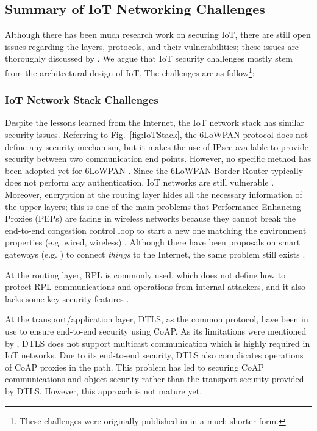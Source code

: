 \documentclass{ieeeaccess}
\begin{document}
\subsection{Summary of IoT Networking Challenges} \label{sec:from-prev}

Although there has been much research work on securing IoT, there are still open issues regarding the layers, protocols, and their vulnerabilities; these issues are thoroughly discussed by \cite{7005393, yang2017survey}. 
% 
We argue that IoT security challenges mostly stem from the architectural design of IoT. The challenges are as follow\footnote{These challenges were originally published in \cite{ramezanifarkhani2018securing} in a much shorter form.}:

\subsubsection{IoT Network Stack Challenges}
Despite the lessons learned from the Internet, the IoT network stack has similar security issues.	 
Referring to Fig.~\ref{fig:IoTStack}, the 6LoWPAN protocol does not define any security mechanism, but it makes the use of IPsec available to provide security between two communication end points. However, no specific method has been adopted yet for 6LoWPAN \cite{7005393}. Since the 6LoWPAN Border Router typically does not perform any authentication, IoT networks are still vulnerable \cite{yang2017survey}. Moreover, encryption at the routing layer hides all the necessary information of the upper layers; this is one of the main problems that Performance Enhancing Proxies (PEPs) \cite{caini2007pepsal} are facing in wireless networks because they cannot break the end-to-end congestion control loop to start a new one matching the environment properties (e.g. wired, wireless) \cite{thai2011satern}. Although there have been proposals on smart gateways (e.g. \cite{bimschas2010middleware,7931688}) to connect \textit{things} to the Internet, the same problem still exists \cite{7005393}.

At the routing layer, RPL \cite{rfc6550} is commonly used, which does not define how to protect RPL communications and operations from internal attackers, and it also lacks some key security features \cite{7005393}. 

At the transport/application layer, DTLS, as the common protocol, have been in use to ensure end-to-end security using CoAP. As its limitations were mentioned by \cite{7005393}, DTLS does not support multicast communication which is highly required in IoT networks. Due to its end-to-end security, DTLS also complicates operations of CoAP proxies in the path. This problem has led to securing CoAP communications and object security rather than the transport security provided by DTLS. However, this approach is not mature yet.
\end{document}
